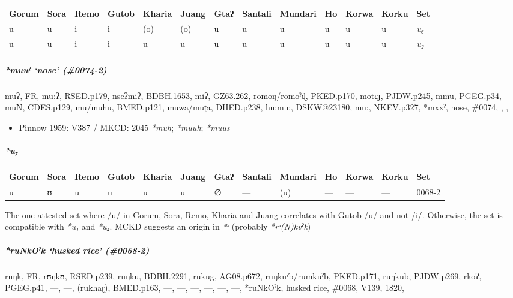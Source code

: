 \documentclass[a4paper,]{article}
\providecommand{\tightlist}{%
  \setlength{\itemsep}{0pt}\setlength{\parskip}{0pt}}
\let\oldparagraph\paragraph
\renewcommand{\paragraph}[1]{\oldparagraph{#1}\mbox{}}
\let\oldsubparagraph\subparagraph
\renewcommand{\subparagraph}[1]{\oldsubparagraph{#1}\mbox{}}
\begin{document}
\begin{longtable}[]{@{}lllllllllllll@{}}
\toprule
Gorum & Sora & Remo & Gutob & Kharia & Juang & Gtaʔ & Santali & Mundari
& Ho & Korwa & Korku & Set\tabularnewline
\midrule
\endhead
u & u & i & i & (o) & (o) & u & u & u & u & u & u &
\emph{u₆}\tabularnewline
u & u & i & i & u & u & u & u & u & u & u & u & \emph{u₂}\tabularnewline
\bottomrule
\end{longtable}

\subparagraph{\texorpdfstring{\emph{*muuˀ} `nose'
(\#0074-2)}{*muuˀ nose (\#0074-2)}}\label{muuux2c0-nose-0074-2}

muʔ, FR, mu:ʔ, RSED.p179, nseʔmiʔ, BDBH.1653, miʔ, GZ63.262,
romoŋ/romoˀɖ, PKED.p170, motɛɟ, PJDW.p245, mmu, PGEG.p34, muN,
CDES.p129, mu/muhu, BMED.p121, muwa/muʈa, DHED.p238, hu:mu:, DSKW@23180,
mu:, NKEV.p327, *mxxˀ, nose, \#0074, , ,

\begin{itemize}
\tightlist
\item
  Pinnow 1959: V387 / MKCD: 2045 \emph{*muh}; \emph{*muuh}; \emph{*muus}
\end{itemize}

\paragraph{\texorpdfstring{\emph{*u₇}}{*u₇}}\label{u-5}

\begin{longtable}[]{@{}lllllllllllll@{}}
\toprule
Gorum & Sora & Remo & Gutob & Kharia & Juang & Gtaʔ & Santali & Mundari
& Ho & Korwa & Korku & Set\tabularnewline
\midrule
\endhead
u & ʊ & u & u & u & u & ∅ & --- & (u) & --- & --- & --- &
0068-2\tabularnewline
\bottomrule
\end{longtable}

The one attested set where /u/ in Gorum, Sora, Remo, Kharia and Juang
correlates with Gutob /u/ and not /i/. Otherwise, the set is compatible
with \emph{*u₁} and \emph{*u₄}. MCKD suggests an origin in \emph{*ᵊ}
(probably \emph{*rᵊ(N)kvˀk})

\subparagraph{\texorpdfstring{\emph{*ruNkOˀk} `husked rice'
(\#0068-2)}{*ruNkOˀk husked rice (\#0068-2)}}\label{runkoux2c0k-husked-rice-0068-2}

ruŋk, FR, rʊŋkʊ, RSED.p239, ruŋku, BDBH.2291, rukug, AG08.p672,
ruŋkuˀb/rumkuˀb, PKED.p171, ruŋkub, PJDW.p269, rkoʔ, PGEG.p41, ---, ---,
(rukhaɽ), BMED.p163, ---, ---, ---, ---, ---, ---, *ruNkOˀk, husked
rice, \#0068, V139, 1820,
\end{document}
